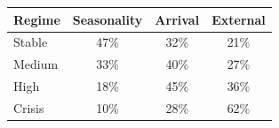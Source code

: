 \begin{tabular}{lccc}
\toprule
Regime & Seasonality & Arrival & External\\
\midrule
Stable & 47\% & 32\% & 21\%\\
Medium & 33\% & 40\% & 27\%\\
High & 18\% & 45\% & 36\%\\
Crisis & 10\% & 28\% & 62\%\\
\bottomrule
\end{tabular}
